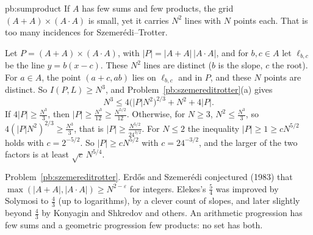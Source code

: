 \begin{solution}{pb:sumproduct}
\idea If $A$ has few sums and few products, the grid $(A+A)\times(A\cdot A)$ is small, yet it carries $N^2$ lines with $N$ points each.
That is too many incidences for Szemerédi--Trotter.

\writeup Let $P=(A+A)\times(A\cdot A)$, with $|P|=|A+A|\,|A\cdot A|$, and for $b,c\in A$ let $\ell_{b,c}$ be the line $y=b(x-c)$. These $N^2$
lines are distinct ($b$ is the slope, $c$ the root). For $a\in A$, the point $(a+c,ab)$ lies on $\ell_{b,c}$ and in $P$, and these $N$ points
are distinct. So $I(P,L)\ge N^3$, and Problem~\ref{pb:szemereditrotter}(a) gives
\[
N^3\le4\bigl(|P|N^2\bigr)^{2/3}+N^2+4|P|.
\]
If $4|P|\ge\frac{N^3}3$, then $|P|\ge\frac{N^3}{12}\ge\frac{N^{5/2}}{12}$. Otherwise, for $N\ge3$, $N^2\le\frac{N^3}3$, so
$4(|P|N^2)^{2/3}\ge\frac{N^3}3$, that is $|P|\ge\frac{N^{5/2}}{24^{3/2}}$. For $N\le2$ the inequality $|P|\ge1\ge cN^{5/2}$ holds with $c=2^{-5/2}$.
So $|P|\ge cN^{5/2}$ with $c=24^{-3/2}$, and the larger of the two factors is at least $\sqrt c\,N^{5/4}$.

\tools Problem~\ref{pb:szemereditrotter}.
\leads Erdős and Szemerédi conjectured (1983) that $\max(|A+A|,|A\cdot A|)\ge N^{2-\varepsilon}$ for integers. Elekes's $\frac54$ was improved by
Solymosi to $\frac43$ (up to logarithms), by a clever count of slopes, and later slightly beyond $\frac43$ by Konyagin and Shkredov
and others. An arithmetic progression has few sums and a geometric progression few products: no set has both.
\end{solution}

